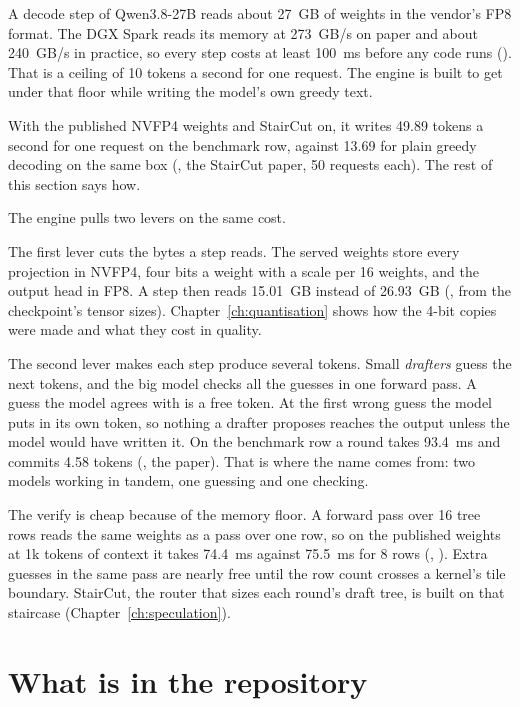 A decode step of Qwen3.8-27B reads about 27~GB of weights in the vendor's FP8 format. The DGX Spark reads its memory at 273~GB/s on paper and about 240~GB/s in practice, so every step costs at least 100~ms before any code runs (\arith). That is a ceiling of 10 tokens a second for one request. The engine is built to get under that floor while writing the model's own greedy text.

With the published NVFP4 weights and StairCut on, it writes 49.89 tokens a second for one request on the benchmark row, against 13.69 for plain greedy decoding on the same box (\measured, the StairCut paper, 50 requests each). The rest of this section says how.

The engine pulls two levers on the same cost.

The first lever cuts the bytes a step reads. The served weights store every projection in NVFP4, four bits a weight with a scale per 16 weights, and the output head in FP8. A step then reads 15.01~GB instead of 26.93~GB (\arith, from the checkpoint's tensor sizes). Chapter~\ref{ch:quantisation} shows how the 4-bit copies were made and what they cost in quality.

The second lever makes each step produce several tokens. Small \emph{drafters} guess the next tokens, and the big model checks all the guesses in one forward pass. A guess the model agrees with is a free token. At the first wrong guess the model puts in its own token, so nothing a drafter proposes reaches the output unless the model would have written it. On the benchmark row a round takes 93.4~ms and commits 4.58 tokens (\measured, the paper). That is where the name comes from: two models working in tandem, one guessing and one checking.

The verify is cheap because of the memory floor. A forward pass over 16 tree rows reads the same weights as a pass over one row, so on the published weights at 1k tokens of context it takes 74.4~ms against 75.5~ms for 8 rows (\measured, ). Extra guesses in the same pass are nearly free until the row count crosses a kernel's tile boundary. StairCut, the router that sizes each round's draft tree, is built on that staircase (Chapter~\ref{ch:speculation}).

\section{What is in the repository}

